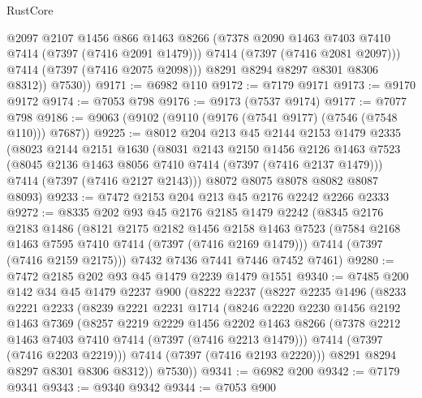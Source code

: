 \begin{lexlean}{RustCore}
\begin{coremodule}
                @2097
                @2107
                @1456
                @866
                @1463
                @8266
                (@7378 @2090 @1463 @7403 @7410 @7414 (@7397 (@7416 @2091 @1479)))
                @7414
                (@7397 (@7416 @2081 @2097)))
              @7414
              (@7397 (@7416 @2075 @2098)))
            @8291
            @8294
            @8297
            @8301
            @8306
            @8312))
        @7530))
@9171 := @6982 @110
@9172 := @7179 @9171
@9173 := @9170 @9172
@9174 := @7053 @798
@9176 := @9173 (@7537 @9174)
@9177 := @7077 @798
@9186 := @9063 (@9102 (@9110 (@9176 (@7541 @9177) (@7546 (@7548 @110))) @7687))
@9225 := @8012
    @204
    @213
    @45
    @2144
    @2153
    @1479
    @2335
    (@8023
      @2144
      @2151
      @1630
      (@8031
        @2143
        @2150
        @1456
        @2126
        @1463
        @7523
        (@8045 @2136 @1463 @8056 @7410 @7414 (@7397 (@7416 @2137 @1479)))
        @7414
        (@7397 (@7416 @2127 @2143)))
      @8072
      @8075
      @8078
      @8082
      @8087
      @8093)
@9233 := @7472 @2153 @204 @213 @45 @2176 @2242 @2266 @2333
@9272 := @8335
    @202
    @93
    @45
    @2176
    @2185
    @1479
    @2242
    (@8345
      @2176
      @2183
      @1486
      (@8121
        @2175
        @2182
        @1456
        @2158
        @1463
        @7523
        (@7584 @2168 @1463 @7595 @7410 @7414 (@7397 (@7416 @2169 @1479)))
        @7414
        (@7397 (@7416 @2159 @2175)))
      @7432
      @7436
      @7441
      @7446
      @7452
      @7461)
@9280 := @7472 @2185 @202 @93 @45 @1479 @2239 @1479 @1551
@9340 := @7485
    @200
    @142
    @34
    @45
    @1479
    @2237
    @900
    (@8222
      @2237
      (@8227
        @2235
        @1496
        (@8233
          @2221
          @2233
          (@8239
            @2221
            @2231
            @1714
            (@8246
              @2220
              @2230
              @1456
              @2192
              @1463
              @7369
              (@8257
                @2219
                @2229
                @1456
                @2202
                @1463
                @8266
                (@7378 @2212 @1463 @7403 @7410 @7414 (@7397 (@7416 @2213 @1479)))
                @7414
                (@7397 (@7416 @2203 @2219)))
              @7414
              (@7397 (@7416 @2193 @2220)))
            @8291
            @8294
            @8297
            @8301
            @8306
            @8312))
        @7530))
@9341 := @6982 @200
@9342 := @7179 @9341
@9343 := @9340 @9342
@9344 := @7053 @900

\end{coremodule}
\end{lexlean}
